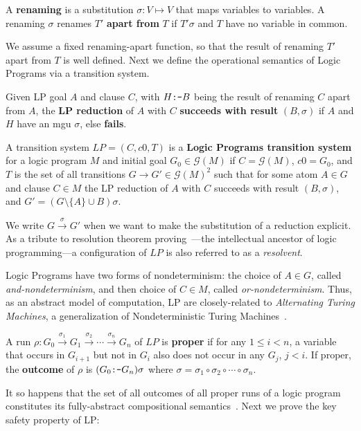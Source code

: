 \documentclass[runningheads,thm-restate]{llncs}
\newcommand{\temph}[1]{\textbf{#1}}  %
\begin{document}
\begin{definition}\label{definition:renaming}
A \temph{renaming} is a substitution $\sigma: V \mapsto V$ that maps variables to variables.
A renaming $\sigma$ renames $T'$ \temph{apart from} $T$ if $T'\sigma$ and $T$  have no variable in common.
\end{definition}
We assume a fixed renaming-apart function, so that the result of renaming $T'$ apart from $T$ is well defined.
Next we define the operational semantics of Logic Programs via a transition system.
 
\begin{definition}\label{definition:logic-goal-clause-reduction}
Given LP goal $A$ and clause $C$,  with $H \verb|:-| B$ being the result of renaming $C$ apart from $A$, the \temph{LP reduction} of $A$ with $C$ \temph{succeeds with result} $(B,\sigma)$ if $A$ and $H$ have an mgu $\sigma$,  else \temph{fails}.
\end{definition}

\begin{definition}\label{definition:lp-ts}
A transition system $LP = (C,c0, T)$ is a \temph{Logic Programs transition system} for a logic program $M$ and initial goal $G_0 \in \mathcal{G}(M)$ if 
$C=\mathcal{G}(M)$, $c0=G_0$, and $T$
is the set of all transitions $G \rightarrow G' \in \mathcal{G}(M)^2$ such that for some atom $A \in G$ and clause $C \in M$  the LP reduction of $A$ with $C$ succeeds with result $(B,\sigma)$, and $G' = (G \setminus \{A\} \cup B)\sigma$.
\end{definition}
We write $G \xrightarrow{\sigma} G'$ when we want to make the substitution of a reduction explicit.
As a tribute to resolution theorem proving~\cite{robinson1965machine}—the intellectual ancestor of logic programming—a configuration of $LP$ is also referred to as a \emph{resolvent}.

Logic Programs have two forms of nondeterminism: the choice of $A\in G$, called \emph{and-nondeterminism}, and then choice of  $C\in M$, called \emph{or-nondeterminism}.  Thus, as an abstract model of computation, LP  are  closely-related to \emph{Alternating Turing Machines}, a generalization of Nondeterministic Turing Machines~\cite{shapiro1984alternation}.

\begin{definition}\label{definition:proper-run}
A run $\rho: G_0 \xrightarrow{\sigma_1} G_1 \xrightarrow{\sigma_2} \cdots \xrightarrow{\sigma_n} G_n$ of $LP$ is \temph{proper} if for any $1\le i<  n$,  a variable that occurs in  $G_{i+1}$ but not in  $G_i$ also does not occur in any $G_j$, $j<i$.   If proper, the \temph{outcome} of $\rho$ is $(G_0 \verb|:-| G_n)\sigma$ where $\sigma = \sigma_1 \circ \sigma_2 \circ \cdots \circ \sigma_n$.
\end{definition}
It so happens that the set of all outcomes of all proper runs of a logic program constitutes its fully-abstract compositional semantics~\cite{gaifman1989fully}.
Next we prove the key safety property of LP:
\end{document}

